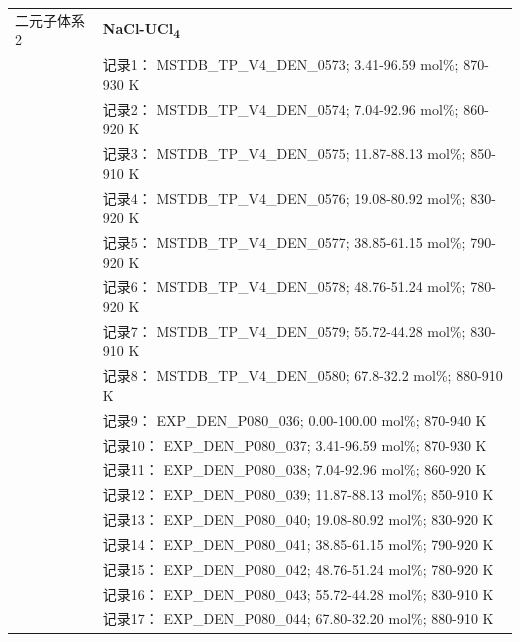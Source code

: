 \documentclass[12pt]{article}
\begin{document}
{\begin{longtable}[]{@{}
  >{\raggedright\arraybackslash}p{}
  >{\raggedright\arraybackslash}p{}@{}}
二元子体系 2  & \textbf{NaCl-UCl\textsubscript{4}} \\
 & 记录1： MSTDB\_TP\_V4\_DEN\_0573; 3.41-96.59 mol\%; 870-930 K \\
 & 记录2： MSTDB\_TP\_V4\_DEN\_0574; 7.04-92.96 mol\%; 860-920 K \\
 & 记录3： MSTDB\_TP\_V4\_DEN\_0575; 11.87-88.13 mol\%; 850-910 K \\
 & 记录4： MSTDB\_TP\_V4\_DEN\_0576; 19.08-80.92 mol\%; 830-920 K \\
 & 记录5： MSTDB\_TP\_V4\_DEN\_0577; 38.85-61.15 mol\%; 790-920 K \\
 & 记录6： MSTDB\_TP\_V4\_DEN\_0578; 48.76-51.24 mol\%; 780-920 K \\
 & 记录7： MSTDB\_TP\_V4\_DEN\_0579; 55.72-44.28 mol\%; 830-910 K \\
 & 记录8： MSTDB\_TP\_V4\_DEN\_0580; 67.8-32.2 mol\%; 880-910 K \\
 & 记录9： EXP\_DEN\_P080\_036; 0.00-100.00 mol\%; 870-940 K \\
 & 记录10： EXP\_DEN\_P080\_037; 3.41-96.59 mol\%; 870-930 K \\
 & 记录11： EXP\_DEN\_P080\_038; 7.04-92.96 mol\%; 860-920 K \\
 & 记录12： EXP\_DEN\_P080\_039; 11.87-88.13 mol\%; 850-910 K \\
 & 记录13： EXP\_DEN\_P080\_040; 19.08-80.92 mol\%; 830-920 K \\
 & 记录14： EXP\_DEN\_P080\_041; 38.85-61.15 mol\%; 790-920 K \\
 & 记录15： EXP\_DEN\_P080\_042; 48.76-51.24 mol\%; 780-920 K \\
 & 记录16： EXP\_DEN\_P080\_043; 55.72-44.28 mol\%; 830-910 K \\
 & 记录17： EXP\_DEN\_P080\_044; 67.80-32.20 mol\%; 880-910 K  \\


\end{longtable}}
\end{document}
